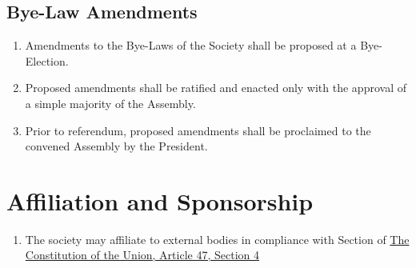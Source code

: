 \documentclass{scrartcl}
\begin{document}
        \subsection{Bye-Law Amendments}
            \label{bye-election--bye-law-amendment}
            \begin{enumerate}
                \item Amendments to the Bye-Laws of the Society shall be proposed at a Bye-Election.
                \item Proposed amendments shall be ratified and enacted only with the approval of a simple majority of the Assembly.
                \item Prior to referendum, proposed amendments shall be proclaimed to the convened Assembly by the President.
            \end{enumerate}

    \clearpage
    \section{Affiliation and Sponsorship}
        \label{affiliation}
        \begin{enumerate}
            \item The society may affiliate to external bodies in compliance with Section of \href{https://lancastersu.co.uk/resources/articles-of-association-2023/download_attachment}{The Constitution of the Union, Article 47, Section 4}
        \end{enumerate}
\end{document}
